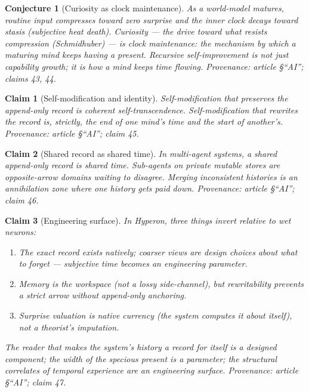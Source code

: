 \documentclass[11pt]{article}
\newtheorem{claim}{Claim}
\newtheorem{conjecture}{Conjecture}
\begin{document}
\begin{conjecture}[Curiosity as clock maintenance]\label{conj:curiosity}
As a world-model matures, routine input compresses toward zero surprise and
the inner clock decays toward stasis (subjective heat death).  Curiosity —
the drive toward what resists compression (Schmidhuber) — is clock
maintenance: the mechanism by which a maturing mind keeps having a present.
Recursive self-improvement is not just capability growth; it is how a mind
keeps time flowing.
\emph{Provenance: article \S``AI''; claims 43, 44.}
\end{conjecture}

\begin{claim}[Self-modification and identity]\label{cl:selfmod}
Self-modification that preserves the append-only record is coherent
self-transcendence.  Self-modification that rewrites the record is,
strictly, the end of one mind's time and the start of another's.
\emph{Provenance: article \S``AI''; claim 45.}
\end{claim}

\begin{claim}[Shared record as shared time]\label{cl:shared}
In multi-agent systems, a shared append-only record is shared time.
Sub-agents on private mutable stores are opposite-arrow domains waiting to
disagree.  Merging inconsistent histories is an annihilation zone where one
history gets paid down.
\emph{Provenance: article \S``AI''; claim 46.}
\end{claim}

\begin{claim}[Engineering surface]\label{cl:engineering}
In Hyperon, three things invert relative to wet neurons:
\begin{enumerate}
  \item The exact record exists natively; coarser views are design choices
    about what to forget — subjective time becomes an engineering parameter.
  \item Memory is the workspace (not a lossy side-channel), but rewritability
    prevents a strict arrow without append-only anchoring.
  \item Surprise valuation is native currency (the system computes it about
    itself), not a theorist's imputation.
\end{enumerate}
The reader that makes the system's history a record for itself is a designed
component; the width of the specious present is a parameter; the structural
correlates of temporal experience are an engineering surface.
\emph{Provenance: article \S``AI''; claim 47.}
\end{claim}
\end{document}
